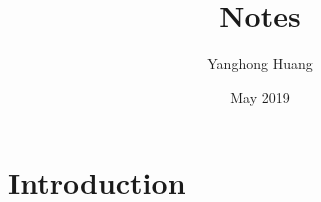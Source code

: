 \documentclass{article}
\title{Notes}
\author{Yanghong Huang}
\date{May 2019}
\begin{document}
\maketitle

\section{Introduction}
\end{document}
